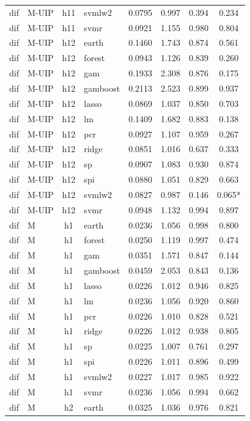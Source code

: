 \begin{ThreePartTable}
\begin{longtable}[t]{llclcccc}
dif & M-UIP & h11 & svmlw2 & 0.0795 & 0.997 & 0.394 & 0.234\\
dif & M-UIP & h11 & svmr & 0.0921 & 1.155 & 0.980 & 0.804\\
\addlinespace
dif & M-UIP & h12 & earth & 0.1460 & 1.743 & 0.874 & 0.561\\
dif & M-UIP & h12 & forest & 0.0943 & 1.126 & 0.839 & 0.260\\
dif & M-UIP & h12 & gam & 0.1933 & 2.308 & 0.876 & 0.175\\
dif & M-UIP & h12 & gamboost & 0.2113 & 2.523 & 0.899 & 0.937\\
dif & M-UIP & h12 & lasso & 0.0869 & 1.037 & 0.850 & 0.703\\
dif & M-UIP & h12 & lm & 0.1409 & 1.682 & 0.883 & 0.138\\
dif & M-UIP & h12 & pcr & 0.0927 & 1.107 & 0.959 & 0.267\\
dif & M-UIP & h12 & ridge & 0.0851 & 1.016 & 0.637 & 0.333\\
dif & M-UIP & h12 & sp & 0.0907 & 1.083 & 0.930 & 0.874\\
dif & M-UIP & h12 & spi & 0.0880 & 1.051 & 0.829 & 0.663\\
dif & M-UIP & h12 & svmlw2 & 0.0827 & 0.987 & 0.146 & 0.065*\\
dif & M-UIP & h12 & svmr & 0.0948 & 1.132 & 0.994 & 0.897\\
\addlinespace
dif & M & h1 & earth & 0.0236 & 1.056 & 0.998 & 0.800\\
dif & M & h1 & forest & 0.0250 & 1.119 & 0.997 & 0.474\\
dif & M & h1 & gam & 0.0351 & 1.571 & 0.847 & 0.144\\
dif & M & h1 & gamboost & 0.0459 & 2.053 & 0.843 & 0.136\\
dif & M & h1 & lasso & 0.0226 & 1.012 & 0.946 & 0.825\\
dif & M & h1 & lm & 0.0236 & 1.056 & 0.920 & 0.860\\
dif & M & h1 & pcr & 0.0226 & 1.010 & 0.828 & 0.521\\
dif & M & h1 & ridge & 0.0226 & 1.012 & 0.938 & 0.805\\
dif & M & h1 & sp & 0.0225 & 1.007 & 0.761 & 0.297\\
dif & M & h1 & spi & 0.0226 & 1.011 & 0.896 & 0.499\\
dif & M & h1 & svmlw2 & 0.0227 & 1.017 & 0.985 & 0.922\\
dif & M & h1 & svmr & 0.0236 & 1.056 & 0.994 & 0.662\\
\addlinespace
dif & M & h2 & earth & 0.0325 & 1.036 & 0.976 & 0.821\\

\end{longtable}
\end{ThreePartTable}
